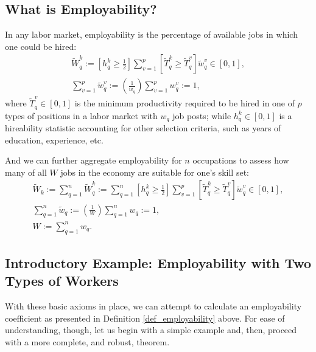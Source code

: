 \documentclass[hidelinks, nonatbib]{elsarticle}
\begin{document}
\subsection{What is Employability?}
\begin{definition}[Employability]
    \label{def_employability}
    In any labor market, employability is the percentage of available jobs in which one could be hired:
    \begin{gather}
    \tilde{W}_{q}^{k}
    :=
    \left[
        h_{q}^{k}
        \geq
        \frac{1}{2}
    \right]
    \sum_{v=1}^{p}
    \left[
        \tilde{T}_{q}^{k}
        \geq
        \tilde{T}_{q}^{v}
    \right]
    \tilde{w}_{q}^{v}
    \in
    [0,1]
    ,
    \\
    \sum_{v=1}^{p}
    \tilde{w}_{q}^{v}
    :=
    \left(
        \frac{1}{w_q}
    \right)
    \sum_{v=1}^{p}
    w_{q}^{v}
    := 1
    ,
    \end{gather}
    where $\tilde{T}_{q}^{v} \in [0,1]$ is the minimum productivity required to be hired in one of $p$ types of positions in a labor market with $w_q$ job posts; while $h_{q}^{k} \in [0,1]$ is a hireability statistic accounting for other selection criteria, such as years of education, experience, etc.
    
    And we can further aggregate employability for $n$ occupations to assess how many of all $W$ jobs in the economy are suitable for one's skill set:
    \begin{gather}
    \tilde{W}_{k}
    :=
    \sum_{q=1}^{n}
    \tilde{W}_{q}^{k}
    :=
    \sum_{q=1}^{n}
    \left[
        h_{q}^{k}
        \geq
        \frac{1}{2}
    \right]
    \sum_{v=1}^{p}
    \left[
        \tilde{T}_{q}^{k}
        \geq
        \tilde{T}_{q}^{v}
    \right]
    \tilde{w}_{q}^{v}
    \in
    [0,1]
    ,
    \\
    \sum_{q=1}^{n}
    \tilde{w}_{q}
    :=
    \left(
        \frac{1}{W}
    \right)
    \sum_{q=1}^{n}
    {w}_{q}
    :=
    1
    ,
    \\
    W
    :=
    \sum_{q=1}^{n}
    {w}_{q}
    .
    \end{gather}
\end{definition}

\subsection{Introductory Example: Employability with Two Types of Workers}
With these basic axioms in place, we can attempt to calculate an employability coefficient as presented in Definition \ref{def_employability} above. For ease of understanding, though, let us begin with a simple example and, then, proceed with a more complete, and robust, theorem.
\end{document}
